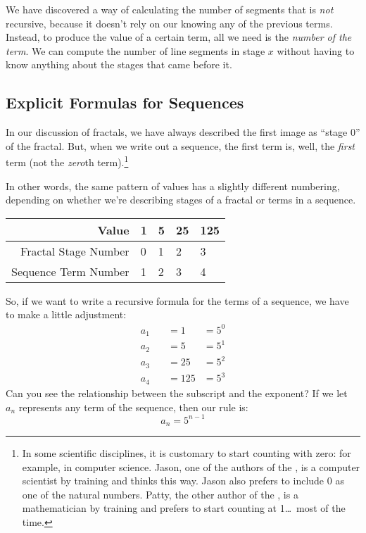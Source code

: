 We have discovered a way of calculating the number of segments that is \textit{not} recursive, because it doesn't rely on our knowing any of the previous terms. Instead, to produce the value of a certain term, all we need is the \textit{number of the term}. We can compute the number of line segments in stage $x$ without having to know anything about the stages that came before it.

\subsection{Explicit Formulas for Sequences}

In our discussion of fractals, we have always described the first image as ``stage 0'' of the fractal. But, when we write out a sequence, the first term is, well, the \textit{first} term (not the \textit{zero}th term).\footnote{In some scientific disciplines, it is customary to start counting with zero: for example, in computer science. Jason, one of the authors of the \algebranomicon, is a computer scientist by training and thinks this way. Jason also prefers to include 0 as one of the natural numbers. Patty, the other author of the \algebranomicon, is a mathematician by training and prefers to start counting at 1\ldots\ most of the time.}

In other words, the same pattern of values has a slightly different numbering, depending on whether we're describing stages of a fractal or terms in a sequence.

\begin{center}\begin{tabular}{rC{0.75cm}C{0.75cm}C{0.75cm}C{0.75cm}}
Value & {1} & {5} & {25} & {125}
\\\hline
Fractal Stage Number & 0 & 1 & 2 & 3
\\
Sequence Term Number & 1 & 2 & 3 & 4
\end{tabular}\end{center}

So, if we want to write a recursive formula for the terms of a sequence, we have to make a little adjustment:
\[\begin{aligned}
a_1 &\quad= 1 &= 5^0
\\
a_2 &\quad= 5 &= 5^1
\\
a_3 &\quad= 25 &= 5^2
\\
a_4 &\quad= 125 &= 5^3
\end{aligned}
\]
Can you see the relationship between the subscript and the exponent? If we let $a_n$ represents any term of the sequence, then our rule is:
\[a_n = 5^{n-1}\]

